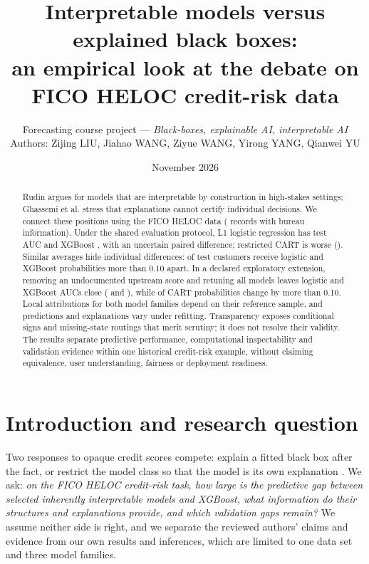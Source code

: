 \documentclass[11pt,a4paper]{article}
\title{\vspace{-1.2cm}Interpretable models versus explained black boxes:\\ an empirical look at the debate on FICO HELOC credit-risk data}
\author{Forecasting course project --- \textit{Black-boxes, explainable AI, interpretable AI}\\
\small Authors: Zijing LIU, Jiahao WANG, Ziyue WANG, Yirong YANG, Qianwei YU}
\date{\vspace{-0.4cm}November 2026}
\begin{document}
\maketitle
\vspace{-0.6cm}
\begin{abstract}
Rudin argues for models that are interpretable by construction in high-stakes settings; Ghassemi et al. stress that explanations cannot certify individual decisions. We connect these positions using the FICO HELOC data (\NPop{} records with bureau information). Under the shared evaluation protocol, L1 logistic regression has test AUC \TestAUCLR{} and XGBoost \TestAUCXGB{}, with an uncertain paired difference; restricted CART is worse (\TestAUCCART{}). Similar averages hide individual differences: \GtTenLRXGB{} of test customers receive logistic and XGBoost probabilities more than 0.10 apart. In a declared exploratory extension, removing an undocumented upstream score and retuning all models leaves logistic and XGBoost AUCs close (\NoScoreAUCLR{} and \NoScoreAUCXGB{}), while \NoScoreChangeTenCART{} of CART probabilities change by more than 0.10. Local attributions for both model families depend on their reference sample, and predictions and explanations vary under refitting. Transparency exposes conditional signs and missing-state routings that merit scrutiny; it does not resolve their validity. The results separate predictive performance, computational inspectability and validation evidence within one historical credit-risk example, without claiming equivalence, user understanding, fairness or deployment readiness.
\end{abstract}

\section{Introduction and research question}
Two responses to opaque credit scores compete: explain a fitted black box after the fact, or restrict the model class so that the model is its own explanation \cite{rudin2019stop}. We ask: \emph{on the FICO HELOC credit-risk task, how large is the predictive gap between selected inherently interpretable models and XGBoost, what information do their structures and explanations provide, and which validation gaps remain?} We assume neither side is right, and we separate the reviewed authors' claims and evidence from our own results and inferences, which are limited to one data set and three model families.
\end{document}
